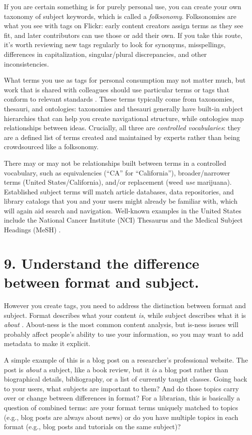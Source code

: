 \documentclass[10pt,letterpaper]{article}
\newcommand{\rulemajor}[1]{\section*{#1}}
\begin{document}
If you are certain something is for purely personal use, you can create your own
taxonomy of subject keywords, which is called a \emph{folksonomy}. Folksonomies
are what you see with tags on Flickr: early content creators assign terms as
they see fit, and later contributors can use those or add their own. If you take
this route, it's worth reviewing new tags regularly to look for synonyms,
misspellings, differences in capitalization, singular/plural discrepancies, and
other inconsistencies.

What terms you use as tags for personal consumption may not matter much, but
work that is shared with colleagues should use particular terms or tags that
conform to relevant standards \cite{FAIR2020}.  These terms typically come from
taxonomies, thesauri, and ontologies: taxonomies and thesauri generally have
built-in subject hierarchies that can help you create navigational structure,
while ontologies map relationships between ideas. Crucially, all three are
\emph{controlled vocabularies}: they are a defined list of terms created and
maintained by experts rather than being crowdsourced like a folksonomy.

There may or may not be relationships built between terms in a controlled
vocabulary, such as equivalencies (``CA'' for ``California''), broader/narrower
terms (United States/California), and/or replacement (weed \emph{use}
marijuana). Established subject terms will match article databases, data
repositories, and library catalogs that you and your users might already be
familiar with, which will again aid search and navigation.  Well-known examples
in the United States include the National Cancer Institute (NCI) Thesaurus
\cite{NCI2020} and the Medical Subject Headings (MeSH) \cite{ASI2020}.

\rulemajor{9. Understand the difference between format and subject.}

However you create tags, you need to address the distinction between format and
subject. Format describes what your content \emph{is}, while subject describes
what it is \emph{about} \cite{Joudrey2015}. About-ness is the most common
content analysis, but is-ness issues will probably affect people's ability to
use your information, so you may want to add metadata to make it explicit.

A simple example of this is a blog post on a researcher's professional website. The post is \emph{about} a
subject, like a book review, but it \emph{is} a blog post rather than biographical details,
bibliography, or a list of currently taught classes.  Going back to your
users, what subjects are important to them? And do those topics carry over or
change between differences in format? For a librarian, this is basically a
question of combined terms: are your format terms uniquely matched to topics
(e.g., blog posts are always about news) or do you have multiple topics in each
format (e.g., blog posts and tutorials on the same subject)?
\end{document}
